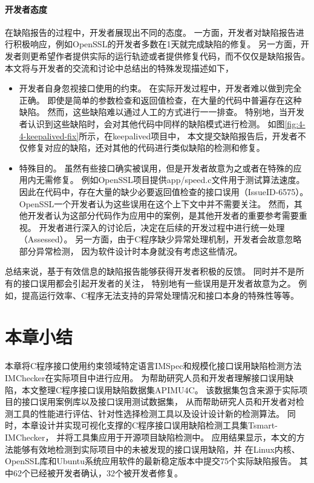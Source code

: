 \paragraph{开发者态度}
在缺陷报告的过程中，开发者展现出不同的态度。
一方面，开发者对缺陷报告进行积极响应，例如OpenSSL的开发者多数在1天就完成缺陷的修复。
另一方面，开发者则更希望作者提供实际的运行轨迹或者提供修复代码，而不仅仅是缺陷报告。
本文将与开发者的交流和讨论中总结出的特殊发现描述如下，
\begin{itemize}
	\item 开发者自身忽视接口使用的约束。
	在实际开发过程中，开发者难以做到完全正确。
	即使是简单的参数检查和返回值检查，在大量的代码中普遍存在这种缺陷。
	然而，这些缺陷难以通过人工的方式进行一一排查。
	特别地，当开发者认识到这些缺陷时，会对其他代码中同样的缺陷模式进行检测。
	如图\ref{fig:4-4-keepalived-fix}所示，在keepalived项目中，
	本文提交缺陷报告后，开发者不仅修复对应的缺陷，还对其他的代码进行类似缺陷的检测和修复。
	\item 特殊目的。
	虽然有些接口确实被误用，但是开发者故意为之或者在特殊的应用内无需修复。
	例如OpenSSL项目提供app/speed.c文件用于测试算法速度。
	因此在代码中，存在大量的缺少必要返回值检查的接口误用（IssueID-6575）。
	OpenSSL一个开发者认为这些误用在这个上下文中并不需要关注。
	然而，其他开发者认为这部分代码作为应用中的案例，是其他开发者的重要参考需要重视。
	开发者进行深入的讨论后，决定在后续的开发过程中进行统一处理（Assessed）。
	另一方面，由于C程序缺少异常处理机制，开发者会故意忽略部分异常检测，
	因为软件设计时本身就没有考虑这些情况。
\end{itemize}

总结来说，基于有效信息的缺陷报告能够获得开发者积极的反馈。
同时并不是所有的接口误用都会引起开发者的关注，
特别地有一些误用是开发者故意为之。
例如，提高运行效率、C程序无法支持的异常处理情况和接口本身的特殊性等等。


\section{本章小结}
\label{sec:4.5}
本章将C程序接口使用约束领域特定语言IMSpec和规模化接口误用缺陷检测方法IMChecker在实际项目中进行应用。
为帮助研究人员和开发者理解接口误用缺陷，本文整理C程序接口误用缺陷数据集APIMU4C。
该数据集包含来源于实际项目的接口误用案例库以及接口误用测试数据集，
从而帮助研究人员和开发者对检测工具的性能进行评估、针对性选择检测工具以及设计设计新的检测算法。
同时，本章设计并实现可视化支撑的C程序接口误用缺陷检测工具集Tsmart-IMChecker，
并将工具集应用于开源项目缺陷检测中。
应用结果显示，本文的方法能够有效地检测到实际项目中的未被发现的接口误用缺陷，并
在Linux内核、OpenSSL库和Ubuntu系统应用软件的最新稳定版本中提交75个实际缺陷报告。
其中62个已经被开发者确认，32个被开发者修复。